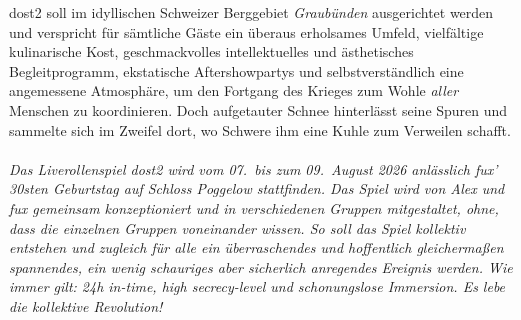 \ac{dost2} soll im idyllischen Schweizer Berggebiet \emph{Graubünden} ausgerichtet
werden und verspricht für sämtliche Gäste ein überaus erholsames Umfeld,
vielfältige kulinarische Kost, geschmackvolles intellektuelles und
ästhetisches Begleitprogramm, ekstatische Aftershowpartys und
selbstverständlich eine angemessene Atmosphäre, um den Fortgang des Krieges zum
Wohle \emph{aller} Menschen zu koordinieren. Doch aufgetauter Schnee hinterlässt
seine Spuren und sammelte sich im Zweifel dort, wo Schwere ihm eine Kuhle zum
Verweilen schafft.\\\\
%
\emph{Das Liverollenspiel \ac{dost2} wird vom 07.~bis zum 09.~August 2026
anlässlich fux' 30sten Geburtstag auf Schloss Poggelow stattfinden. Das Spiel
wird von Alex und fux gemeinsam konzeptioniert und in verschiedenen Gruppen
mitgestaltet, ohne, dass die einzelnen Gruppen voneinander wissen. So soll das
Spiel kollektiv entstehen und zugleich für alle ein überraschendes und
hoffentlich gleichermaßen spannendes, ein wenig schauriges aber sicherlich
anregendes Ereignis werden. Wie immer gilt: 24h in-time, high secrecy-level und
schonungslose Immersion. Es lebe die kollektive Revolution!}
\bigskip
\bigskip
\bigskip
{}
